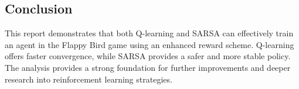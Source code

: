 \documentclass[conference]{IEEEtran}
\begin{document}
\subsection{Conclusion}
This report demonstrates that both Q-learning and SARSA can effectively train an agent in the Flappy Bird game using an enhanced reward scheme. Q-learning offers faster convergence, while SARSA provides a safer and more stable policy. The analysis provides a strong foundation for further improvements and deeper research into reinforcement learning strategies.

%    
\end{document}
